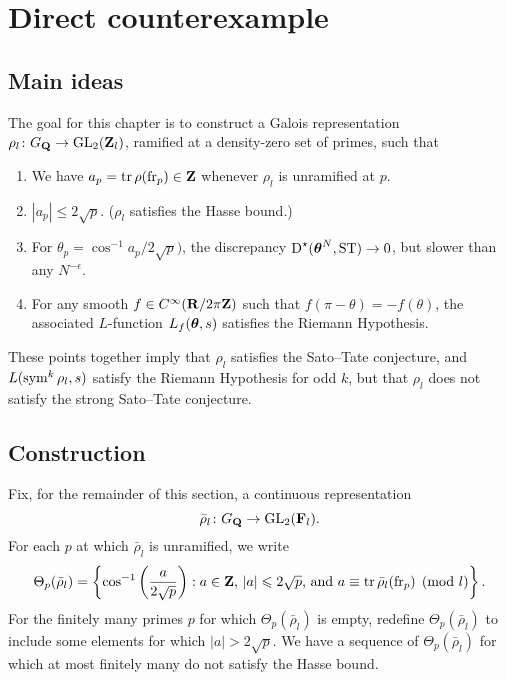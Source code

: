
\chapter{Direct counterexample}





\section{Main ideas}

The goal for this chapter is to construct a Galois representation 
$\rho_l\colon G_{\mathbf{Q}} \to \operatorname{GL}_2(\mathbf{Z}_l)$, ramified at a density-zero set of 
primes, such that 
\begin{enumerate}
\item
We have $a_p = \operatorname{tr} \rho(\mathrm{fr}_p)\in \mathbf{Z}$ whenever $\rho_l$ is unramified at 
$p$. 

\item
$|a_p|\leqslant 2\sqrt p$. ($\rho_l$ satisfies the Hasse bound.)

\item
For $\theta_p=\cos^{-1}a_p / 2\sqrt p)$, the discrepancy 
$\operatorname{D}^\star({\boldsymbol\theta}^N,\mathrm{ST})\to 0$, but slower than any $N^{-\epsilon}$. 

\item
For any smooth $f\in C^\infty(\mathbf{R}/2\pi\mathbf{Z})$ such that 
$f(\pi-\theta) = -f(\theta)$, the associated $L$-function 
$L_f({\boldsymbol\theta},s)$ satisfies the Riemann Hypothesis. 
\end{enumerate}

These points together imply that $\rho_l$ satisfies the Sato--Tate conjecture, 
and $L(\operatorname{sym}^k \rho_l,s)$ satisfy the Riemann Hypothesis for odd $k$, but that 
$\rho_l$ does not satisfy the strong Sato--Tate conjecture. 





\section{Construction}

Fix, for the remainder of this section, a continuous representation 
\[
	\bar\rho_l \colon G_{\mathbf{Q}} \to \operatorname{GL}_2(\mathbf{F}_l) .
\]
For each $p$ at which $\bar\rho_l$ is unramified, we write 
\[
	\Theta_p(\bar\rho_l) = \left\{\cos^{-1}\left(\frac{a}{2\sqrt p}\right) : a\in \mathbf{Z}\text{, }|a|\leqslant 2\sqrt p\text{, and }a\equiv \operatorname{tr}\bar\rho_l(\mathrm{fr}_p)\pmod l\right\} .
\]
For the finitely many primes $p$ for which $\Theta_p(\bar\rho_l)$ is empty, 
redefine $\Theta_p(\bar\rho_l)$ to include some elements for which 
$|a|>2\sqrt p$. We have a sequence of $\Theta_p(\bar\rho_l)$ for which at most 
finitely many do not satisfy the Hasse bound. 

